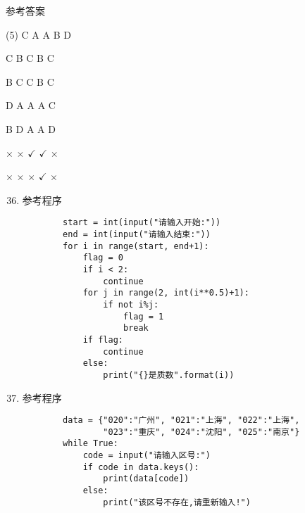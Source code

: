 \documentclass[11pt]{ctexart}
\begin{document}
\begin{center}
    \Huge \heiti 参考答案
\end{center}

    \begin{tasks}[label=\arabic*.](5)
        \task C
        \task A
        \task A
        \task B
        \task D

        \task C
        \task B
        \task C
        \task B
        \task C

        \task B
        \task C
        \task C
        \task B
        \task C

        \task D
        \task A
        \task A
        \task A
        \task C

        \task B
        \task D
        \task A
        \task A
        \task D

        \task $\times$
        \task $\times$
        \task $\checkmark$
        \task $\checkmark$
        \task $\times$

        \task $\times$
        \task $\times$
        \task $\times$
        \task $\checkmark$
        \task $\times$
    \end{tasks}

\begin{enumerate}
    \setcounter{enumi}{35}
    \item 参考程序
    \begin{lstlisting}
        start = int(input("请输入开始:"))
        end = int(input("请输入结束:"))
        for i in range(start, end+1):
            flag = 0
            if i < 2:
                continue
            for j in range(2, int(i**0.5)+1):
                if not i%j:
                    flag = 1
                    break
            if flag:
                continue
            else:
                print("{}是质数".format(i))
    \end{lstlisting}

    \item 参考程序
    \begin{lstlisting}
        data = {"020":"广州", "021":"上海", "022":"上海", 
                "023":"重庆", "024":"沈阳", "025":"南京"}
        while True:
            code = input("请输入区号:")
            if code in data.keys():
                print(data[code])
            else:
                print("该区号不存在,请重新输入!")
    \end{lstlisting}
\end{enumerate}
\end{document}
